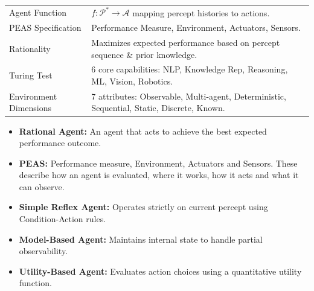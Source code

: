 \documentclass[12pt,a4paper]{article}
\renewcommand{\arraystretch}{1.45}
\begin{document}
\begin{tcolorbox}[formulabox, title={\textbf{Key Concepts and Metrics at a Glance}}]
\renewcommand{\arraystretch}{1.35}
\begin{tabularx}{\linewidth}{B{4.5cm} X}
Agent Function & $f: \mathcal{P}^* \to \mathcal{A}$ mapping percept histories to actions. \\[4pt]
PEAS Specification & Performance Measure, Environment, Actuators, Sensors. \\[4pt]
Rationality & Maximizes expected performance based on percept sequence \& prior knowledge. \\[4pt]
Turing Test & 6 core capabilities: NLP, Knowledge Rep, Reasoning, ML, Vision, Robotics. \\[4pt]
Environment Dimensions & 7 attributes: Observable, Multi-agent, Deterministic, Sequential, Static, Discrete, Known. \\
\end{tabularx}
\end{tcolorbox}

\begin{tcolorbox}[defbox, title={\textbf{One-Line Definitions}}]
  \begin{itemize}[leftmargin=*, noitemsep]
    \item \textbf{Rational Agent:} An agent that acts to achieve the best expected performance outcome.
    \item \textbf{PEAS:} Performance measure, Environment, Actuators and Sensors. These describe how an agent is evaluated, where it works, how it acts and what it can observe.
    \item \textbf{Simple Reflex Agent:} Operates strictly on current percept using Condition-Action rules.
    \item \textbf{Model-Based Agent:} Maintains internal state to handle partial observability.
    \item \textbf{Utility-Based Agent:} Evaluates action choices using a quantitative utility function.
  \end{itemize}
\end{tcolorbox}
\end{document}
